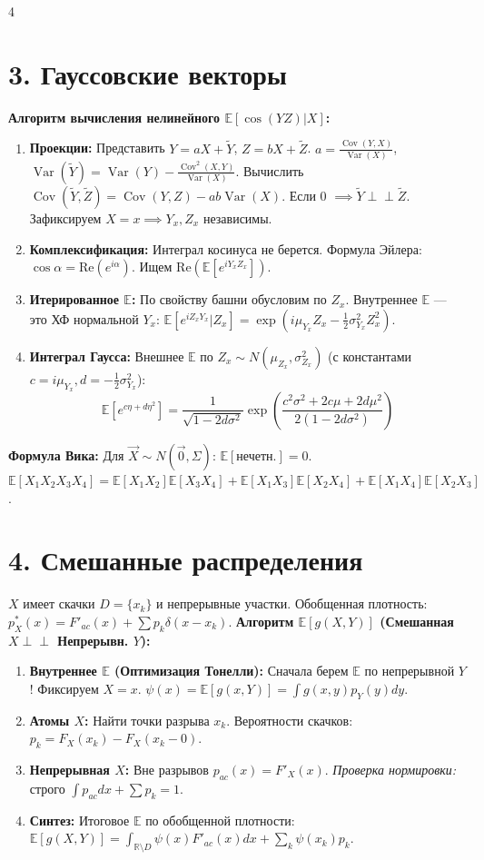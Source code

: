 \documentclass[8pt, a4paper, landscape]{extarticle}
\newcommand{\E}{\mathbb{E}}
\DeclareMathOperator{\Var}{Var}
\DeclareMathOperator{\Cov}{Cov}
\begin{document}
\begin{multicols*}{4}
\section*{3. Гауссовские векторы}
\textbf{Алгоритм вычисления нелинейного $\E[\cos(YZ)|X]$:}
\begin{enumerate}
    \item \textbf{Проекции:} Представить $Y = aX+\tilde{Y}$, $Z=bX+\tilde{Z}$.
    $a \!=\! \frac{\Cov(Y,X)}{\Var(X)}$, $\Var(\tilde{Y}) \!=\! \Var(Y) - \frac{\Cov^2(X,Y)}{\Var(X)}$.
    Вычислить $\Cov(\tilde{Y},\tilde{Z}) \!=\! \Cov(Y,Z) - ab\Var(X)$. Если 0 $\implies \tilde{Y} \perp\!\!\perp \tilde{Z}$. Зафиксируем $X=x \implies Y_x, Z_x$ независимы.
    \item \textbf{Комплексификация:} Интеграл косинуса не берется. Формула Эйлера: $\cos \alpha = \text{Re}(e^{i\alpha})$. Ищем $\text{Re}(\E[e^{iY_x Z_x}])$.
    \item \textbf{Итерированное $\E$:} По свойству башни обусловим по $Z_x$. Внутреннее $\E$ --- это ХФ нормальной $Y_x$:
    $\E[e^{i Z_x Y_x}|Z_x] = \exp(i\mu_{Y_x} Z_x - \frac{1}{2}\sigma_{Y_x}^2 Z_x^2)$.
    \item \textbf{Интеграл Гаусса:} Внешнее $\E$ по $Z_x \sim N(\mu_{Z_x}, \sigma_{Z_x}^2)$ (с константами $c=i\mu_{Y_x}, d=-\frac{1}{2}\sigma_{Y_x}^2$):
    $$ \E[e^{c\eta + d\eta^2}] = \frac{1}{\sqrt{1-2d\sigma^2}}\exp\left( \frac{c^2\sigma^2+2c\mu+2d\mu^2}{2(1-2d\sigma^2)} \right) $$
\end{enumerate}

\textbf{Формула Вика:} Для $\vec{X} \sim N(\vec{0}, \Sigma)$: $\E[\text{нечетн.}]=0$.
$\E[X_1 X_2 X_3 X_4] = \E[X_1 X_2]\E[X_3 X_4] + \E[X_1 X_3]\E[X_2 X_4] + \E[X_1 X_4]\E[X_2 X_3]$.

\section*{4. Смешанные распределения}
$X$ имеет скачки $D=\{x_k\}$ и непрерывные участки. Обобщенная плотность: $p_X^*(x) = F'_{ac}(x) + \sum p_k \delta(x-x_k)$.
\textbf{Алгоритм $\E[g(X,Y)]$ (Смешанная $X \perp\!\!\perp$ Непрерывн. $Y$):}
\begin{enumerate}
    \item \textbf{Внутреннее $\E$ (Оптимизация Тонелли):} Сначала берем $\E$ по непрерывной $Y$! Фиксируем $X=x$. $\psi(x) = \E[g(x,Y)] = \int g(x,y)p_Y(y)dy$.
    \item \textbf{Атомы $X$:} Найти точки разрыва $x_k$. Вероятности скачков: $p_k = F_X(x_k) - F_X(x_k-0)$.
    \item \textbf{Непрерывная $X$:} Вне разрывов $p_{ac}(x) = F'_X(x)$. \textit{Проверка нормировки:} строго $\int p_{ac}dx + \sum p_k = 1$.
    \item \textbf{Синтез:} Итоговое $\E$ по обобщенной плотности:
    $\E[g(X,Y)] = \int_{\mathbb{R}\setminus D} \psi(x) F'_{ac}(x) dx + \sum_{k} \psi(x_k) p_k$.
\end{enumerate}


\end{multicols*}
\end{document}
